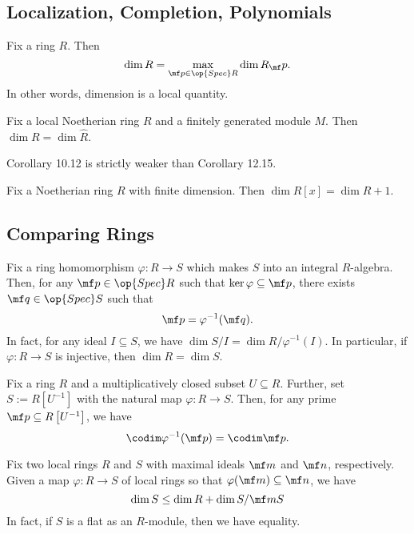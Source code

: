 \documentclass{article}
\begin{document}
\subsection{Localization, Completion, Polynomials}
\begin{theorem*} \label{thm:dimislocal}
	Fix a ring $R$. Then
	\[\dim R=\max_{\mf p\in\op{Spec}R}\dim R_\mf p.\]
	In other words, dimension is a local quantity.
\end{theorem*}
\begin{corollary*}[Corollary 10.12]
	Fix a local Noetherian ring $R$ and a finitely generated module $M$. Then $\dim R=\dim\widehat R$.
\end{corollary*}
\begin{remark*}
	Corollary 10.12 is strictly weaker than Corollary 12.15.
\end{remark*}
\begin{cor*}[Corollary 10.13] \label{prop:polyringdimension}
	Fix a Noetherian ring $R$ with finite dimension. Then $\dim R[x]=\dim R+1$.
\end{cor*}

\subsection{Comparing Rings}
\begin{proposition*}[Proposition 9.2] \label{prop:intextensiondimen}
	Fix a ring homomorphism $\varphi\colon R\to S$ which makes $S$ into an integral $R$-algebra. Then, for any $\mf p\in\op{Spec}R$ such that $\ker\varphi\subseteq\mf p$, there exists $\mf q\in\op{Spec}S$ such that
	\[\mf p=\varphi^{-1}(\mf q).\]
	In fact, for any ideal $I\subseteq S$, we have $\dim S/I=\dim R/\varphi^{-1}(I)$. In particular, if $\varphi\colon R\to S$ is injective, then $\dim R=\dim S$.
\end{proposition*}
\begin{lem*} \label{lem:localizedim}
	Fix a ring $R$ and a multiplicatively closed subset $U\subseteq R$. Further, set $S:=R\left[U^{-1}\right]$ with the natural map $\varphi:R\to S$. Then, for any prime $\mf p\subseteq R\left[U^{-1}\right]$, we have
	\[\codim\varphi^{-1}(\mf p)=\codim\mf p.\]
\end{lem*}
\begin{theorem*}[Theorem 10.10] \label{prop:ranknullity}
	Fix two local rings $R$ and $S$ with maximal ideals $\mf m$ and $\mf n$, respectively. Given a map $\varphi:R\to S$ of local rings so that $\varphi(\mf m)\subseteq\mf n$, we have
	\[\dim S\le\dim R+\dim S/\mf mS\]
	In fact, if $S$ is a flat as an $R$-module, then we have equality.
\end{theorem*}
\end{document}
